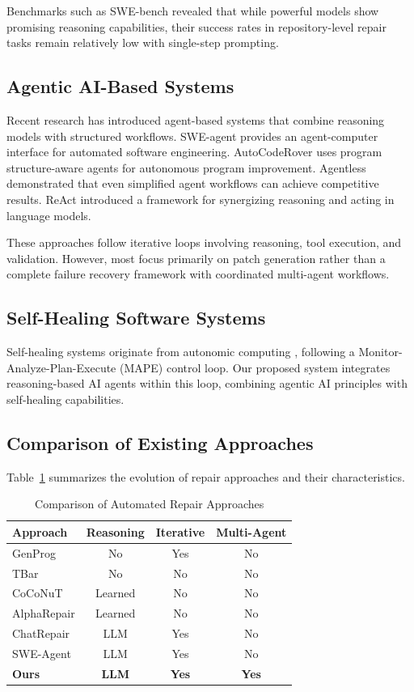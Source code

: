 \documentclass[conference]{IEEEtran}
\begin{document}
Benchmarks such as SWE-bench \cite{swebench} revealed that while powerful models show promising reasoning capabilities, their success rates in repository-level repair tasks remain relatively low with single-step prompting.

\subsection{Agentic AI-Based Systems}
Recent research has introduced agent-based systems that combine reasoning models with structured workflows. SWE-agent \cite{swebenchagent} provides an agent-computer interface for automated software engineering. AutoCodeRover \cite{autocoderover} uses program structure-aware agents for autonomous program improvement. Agentless \cite{agentless} demonstrated that even simplified agent workflows can achieve competitive results. ReAct \cite{react} introduced a framework for synergizing reasoning and acting in language models.

These approaches follow iterative loops involving reasoning, tool execution, and validation. However, most focus primarily on patch generation rather than a complete failure recovery framework with coordinated multi-agent workflows.

\subsection{Self-Healing Software Systems}
Self-healing systems originate from autonomic computing \cite{autonomic}, following a Monitor-Analyze-Plan-Execute (MAPE) control loop. Our proposed system integrates reasoning-based AI agents within this loop, combining agentic AI principles with self-healing capabilities.

\subsection{Comparison of Existing Approaches}
Table~\ref{tab:litcomparison} summarizes the evolution of repair approaches and their characteristics.

\begin{table}[htbp]
\caption{Comparison of Automated Repair Approaches}
\label{tab:litcomparison}
\centering
\small
\begin{tabular}{lccc}
\toprule
\textbf{Approach} & \textbf{Reasoning} & \textbf{Iterative} & \textbf{Multi-Agent} \\
\midrule
GenProg \cite{genprog} & No & Yes & No \\
TBar \cite{templateapr} & No & No & No \\
CoCoNuT \cite{coconut} & Learned & No & No \\
AlphaRepair \cite{alpharepair} & Learned & No & No \\
ChatRepair \cite{chatrepair} & LLM & Yes & No \\
SWE-Agent \cite{swebenchagent} & LLM & Yes & No \\
\textbf{Ours} & \textbf{LLM} & \textbf{Yes} & \textbf{Yes} \\
\bottomrule
\end{tabular}
\end{table}
\end{document}
